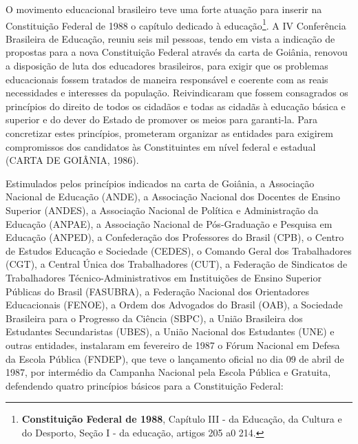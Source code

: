 O movimento educacional brasileiro teve uma forte atuação para inserir
na Constituição Federal de 1988 o capítulo dedicado à educação\footnote{\textbf{Constituição
  Federal de 1988}, Capítulo III - da Educação, da Cultura e do
  Desporto,\protect\hypertarget{tituloviiicapituloiiisecaoi}{}{} Seção I
  - da educação, artigos 205 a0 214.}. A IV Conferência Brasileira de
Educação, reuniu seis mil pessoas, tendo em vista a indicação de
propostas para a nova Constituição Federal através da carta de Goiânia,
renovou a disposição de luta dos educadores brasileiros, para exigir que
os problemas educacionais fossem tratados de maneira responsável e
coerente com as reais necessidades e interesses da população.
Reivindicaram que fossem consagrados os princípios do direito de todos
os cidadãos e todas as cidadãs à educação básica e superior e do dever
do Estado de promover os meios para garanti-la. Para concretizar estes
princípios, prometeram organizar as entidades para exigirem compromissos
dos candidatos às Constituintes em nível federal e estadual (CARTA DE
GOIÂNIA, 1986).

Estimulados pelos princípios indicados na carta de Goiânia, a Associação
Nacional de Educação (ANDE), a Associação Nacional dos Docentes de
Ensino Superior (ANDES), a Associação Nacional de Política e
Administração da Educação (ANPAE), a Associação Nacional de
Pós-Graduação e Pesquisa em Educação (ANPED), a Confederação dos
Professores do Brasil (CPB), o Centro de Estudos Educação e Sociedade
(CEDES), o Comando Geral dos Trabalhadores (CGT), a Central Única dos
Trabalhadores (CUT), a Federação de Sindicatos de Trabalhadores
Técnico-Administrativos em Instituições de Ensino Superior Públicas do
Brasil (FASUBRA), a Federação Nacional dos Orientadores Educacionais
(FENOE), a Ordem dos Advogados do Brasil (OAB), a Sociedade Brasileira
para o Progresso da Ciência (SBPC), a União Brasileira dos Estudantes
Secundaristas (UBES), a União Nacional dos Estudantes (UNE) e outras
entidades, instalaram em fevereiro de 1987 o Fórum Nacional em Defesa da
Escola Pública (FNDEP), que teve o lançamento oficial no dia 09 de abril
de 1987, por intermédio da Campanha Nacional pela Escola Pública e
Gratuita, defendendo quatro princípios básicos para a Constituição
Federal:

